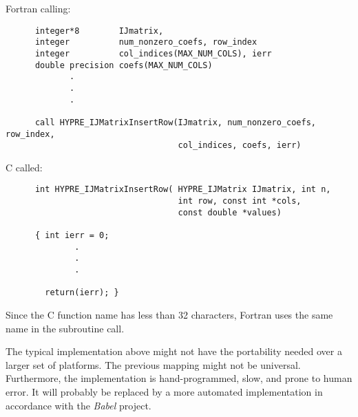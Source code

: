   Fortran calling:
\begin{verbatim}
      integer*8        IJmatrix, 
      integer          num_nonzero_coefs, row_index
      integer          col_indices(MAX_NUM_COLS), ierr
      double precision coefs(MAX_NUM_COLS)
             .
             .
             .

      call HYPRE_IJMatrixInsertRow(IJmatrix, num_nonzero_coefs, row_index,
                                   col_indices, coefs, ierr)
\end{verbatim}

\vspace{0.1in}

  C called:
\begin{verbatim}
      int HYPRE_IJMatrixInsertRow( HYPRE_IJMatrix IJmatrix, int n,
                                   int row, const int *cols,
                                   const double *values)     

      { int ierr = 0;
              .
              .
              .

        return(ierr); }
\end{verbatim}

\noindent Since the C function name has less than 32 characters, Fortran
uses the same name in the subroutine call.

The typical implementation above might not have the portability needed
over a larger set of platforms.  The previous mapping might
not be universal.  Furthermore,
the implementation is hand-programmed, slow, and prone to human error.
It will probably be replaced by a more automated implementation in accordance
with the {\slshape Babel} project. 

